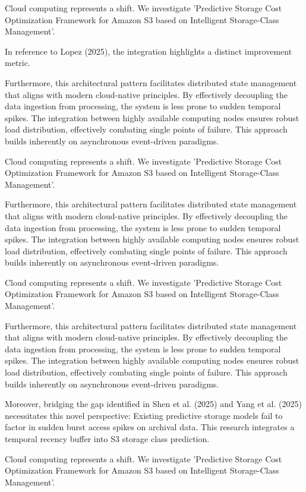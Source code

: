 Cloud computing represents a shift. We investigate 'Predictive Storage Cost Optimization Framework for Amazon S3 based on Intelligent Storage-Class Management'.

In reference to Lopez (2025), the integration highlights a distinct improvement metric.


Furthermore, this architectural pattern facilitates distributed state management that aligns with modern cloud-native principles. 
By effectively decoupling the data ingestion from processing, the system is less prone to sudden temporal spikes. 
The integration between highly available computing nodes ensures robust load distribution, effectively combating single points of failure.
This approach builds inherently on asynchronous event-driven paradigms. 


Cloud computing represents a shift. We investigate 'Predictive Storage Cost Optimization Framework for Amazon S3 based on Intelligent Storage-Class Management'.


Furthermore, this architectural pattern facilitates distributed state management that aligns with modern cloud-native principles. 
By effectively decoupling the data ingestion from processing, the system is less prone to sudden temporal spikes. 
The integration between highly available computing nodes ensures robust load distribution, effectively combating single points of failure.
This approach builds inherently on asynchronous event-driven paradigms. 


Cloud computing represents a shift. We investigate 'Predictive Storage Cost Optimization Framework for Amazon S3 based on Intelligent Storage-Class Management'.


Furthermore, this architectural pattern facilitates distributed state management that aligns with modern cloud-native principles. 
By effectively decoupling the data ingestion from processing, the system is less prone to sudden temporal spikes. 
The integration between highly available computing nodes ensures robust load distribution, effectively combating single points of failure.
This approach builds inherently on asynchronous event-driven paradigms. 


Moreover, bridging the gap identified in Shen et al. (2025) and Yang et al. (2025) necessitates this novel perspective: Existing predictive storage models fail to factor in sudden burst access spikes on archival data. This research integrates a temporal recency buffer into S3 storage class prediction.

Cloud computing represents a shift. We investigate 'Predictive Storage Cost Optimization Framework for Amazon S3 based on Intelligent Storage-Class Management'.

